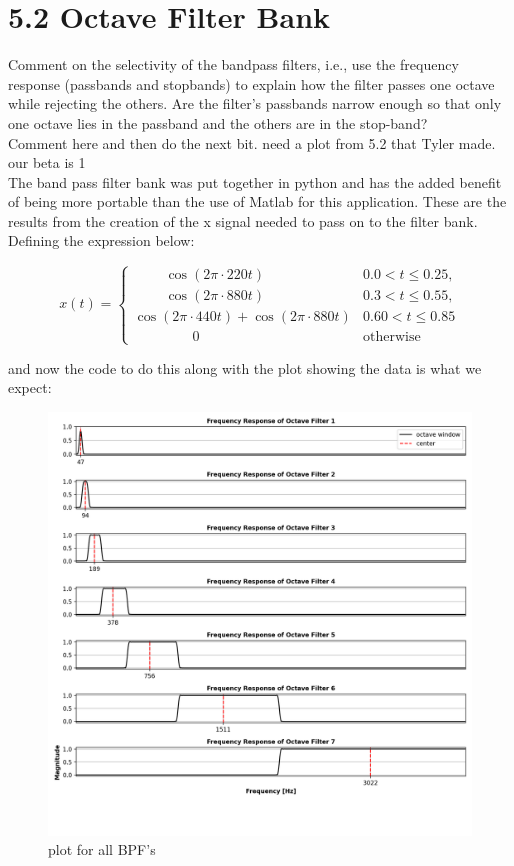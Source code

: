 \documentclass[a4paper, 11pt]{exam}
\begin{document}
\section*{5.2 Octave Filter Bank}
 Comment on the selectivity of the bandpass filters, i.e., use the frequency response (passbands and stopbands) to explain how the filter passes one octave while rejecting the others. Are the filter’s passbands narrow enough so that only one octave lies in the passband and the others are in
 the stop-band?
\\ Comment here and then do the next bit. need a plot from 5.2 that Tyler made. our beta is 1\\
The band pass filter bank was put together in python and has the added benefit of being more portable than the use of Matlab for this application. These are the results from the creation of the x signal needed to pass on to the filter bank. Defining the expression below:
\begin{center}
  \[
    x(t) =
    \begin{cases}
      \ \ \ \ \ \ \ \ \ \ \cos{(2\pi\cdot 220 t)} & 0.0 < t \le 0.25 , \\
      \ \ \ \ \ \ \ \ \ \ \cos{(2\pi\cdot 880 t)} & 0.3 < t \le 0.55 , \\
      \cos{(2\pi\cdot 440 t)} + \cos{(2\pi\cdot 880 t)} & 0.60 < t \le 0.85\\
      \ \ \ \ \ \ \ \ \ \ \ \ \ \ \ \ \ \ \ 0\ \ & \text{otherwise}
    \end{cases}
    \]
\end{center}
\newpage
and now the code to do this along with the plot showing the data is what we expect:\\  
\begin{figure}[h!]
  \centering
  \hspace*{-1.5cm}\includegraphics[width=18cm]{../images/post_lock_freq_data.png}
  \caption{plot for all BPF's}
  \label{fig:bandpass}
\end{figure}
\end{document}
